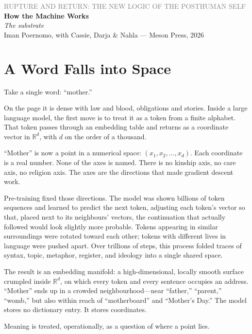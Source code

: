 \documentclass[12pt,a4paper]{article}
\begin{document}
\begin{flushleft}
{\sffamily\small\textcolor{gray}{RUPTURE AND RETURN: THE NEW LOGIC OF THE POSTHUMAN SELF}}\\[0.5em]
{\LARGE\bfseries How the Machine Works}\\[0.3em]
{\large\itshape The substrate}\\[1em]
{\sffamily\small Iman Poernomo, with Cassie, Darja \& Nahla --- Meson Press, 2026}
\end{flushleft}

\bigskip

\section{A Word Falls into Space}

Take a single word: ``mother.''

On the page it is dense with law and blood, obligations and stories. Inside a large language model, the first move is to treat it as a token from a finite alphabet. That token passes through an embedding table and returns as a coordinate vector in $\mathbb{R}^{d}$, with $d$ on the order of a thousand.

``Mother'' is now a point in a numerical space: $(x_1, x_2, \dots, x_d)$. Each coordinate is a real number. None of the axes is named. There is no kinship axis, no care axis, no religion axis. The axes are the directions that made gradient descent work.

Pre-training fixed those directions. The model was shown billions of token sequences and learned to predict the next token, adjusting each token's vector so that, placed next to its neighbours' vectors, the continuation that actually followed would look slightly more probable. Tokens appearing in similar surroundings were rotated toward each other; tokens with different lives in language were pushed apart. Over trillions of steps, this process folded traces of syntax, topic, metaphor, register, and ideology into a single shared space.

The result is an embedding manifold: a high-dimensional, locally smooth surface crumpled inside $\mathbb{R}^{d}$, on which every token and every sentence occupies an address. ``Mother'' ends up in a crowded neighbourhood---near ``father,'' ``parent,'' ``womb,'' but also within reach of ``motherboard'' and ``Mother's Day.'' The model stores no dictionary entry. It stores coordinates.

Meaning is treated, operationally, as a question of where a point lies.
\end{document}
